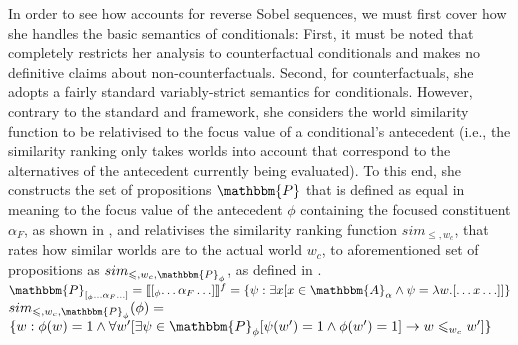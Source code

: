 In order to see how \textcite{Ippolito2020} accounts for reverse Sobel sequences, we must first cover how she handles the basic semantics of conditionals: First, it must be noted that \textcite{Ippolito2020} completely restricts her analysis to counterfactual conditionals and makes no definitive claims about non-counterfactuals. Second, for counterfactuals, she adopts a fairly standard variably-strict semantics for conditionals.
\ex{}
\xe
However, contrary to the standard \textcite{Stalnaker1968} and \textcite{Lewis1973} framework, she considers the world similarity function to be relativised to the focus value of a conditional's antecedent (i.e., the similarity ranking only takes worlds into account that correspond to the alternatives of the antecedent currently being evaluated). To this end, she constructs the set of propositions $\mathbbm{P}$ that is defined as equal in meaning to the focus value of the antecedent $\phi$ containing the focused constituent $\alpha_F$, as shown in , and relativises the similarity ranking function $sim_{\leqslant,w_c}$, that rates how similar worlds are to the actual world $w_c$, to aforementioned set of propositions as $sim_{\leqslant,w_c,\mathbbm{P}_\phi}$, as defined in .
\pex\label{def:ippolito-vs}
\a $\mathbbm{P}_{[_\phi\ldots\alpha_F\ldots]}=\intension[f]{$[_\phi\ldots\alpha_F\ldots]$}=\{\psi:\exists{x}[x\in\mathbbm{A}_\alpha\land\psi=\lambda{w}.[\ldots{x}\ldots]]\}$
\a $sim_{\leqslant,w_c,\mathbbm{P}_\phi}(\phi)=\\$\emptyfill$\{w:\phi(w)=1\land\forall{w'}[\exists\psi\in\mathbbm{P}_\phi[\psi(w')=1\land\phi(w')=1]\rightarrow w\leqslant_{w_c}w']\}$
\xe
